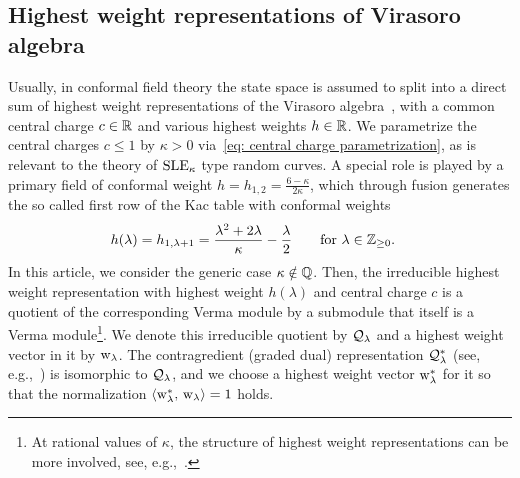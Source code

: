 \documentclass[oneside,english]{amsart}
\numberwithin{equation}{section}
\numberwithin{figure}{section}
\theoremstyle{plain}
\theoremstyle{plain}
\theoremstyle{plain}
\theoremstyle{remark}
\theoremstyle{plain}
\theoremstyle{plain}
\theoremstyle{plain}
\theoremstyle{plain}
\theoremstyle{plain}
\theoremstyle{plain}
\theoremstyle{plain}
\theoremstyle{plain}
\newcommand{\blue}[1]{{\color{blue} #1}}
\newcommand{\red}[1]{{\color{red} #1}}
\begin{document}
\subsection{Highest weight representations of Virasoro algebra}


Usually, in
conformal field theory the state space is assumed to split into a
direct sum of highest weight representations of the Virasoro 
algebra~\cite{Kac-ICM_proceedings_Helsinki, FF-representations, IK-representation_theory_of_the_Virasoro_algebra},
with a common central charge $c\in\mathbb{R}$ and various highest weights
$h\in\mathbb{R}$. We parametrize the central charges $c\leq1$ 
by $\kappa>0$ via~\eqref{eq: central charge parametrization},
as is relevant to the theory of $\mathrm{SLE}_{\kappa}$ type random curves.
A special role is played by a primary field of conformal
weight $h=h_{1, 2} = \frac{6-\kappa}{2\kappa}$, %
which through fusion generates the so called first row of the Kac table with conformal weights 
\begin{align*} %
h(\lambda) = \; & h_{1,\lambda+1}=\frac{\lambda^{2}+2\lambda}{\kappa}-\frac{\lambda}{2} \qquad 
\text{for }
\lambda\in\Znn.
\end{align*}
In this article, we consider the generic case
$\kappa\notin\mathbb{Q}$. %
Then, the irreducible highest weight representation with highest weight $h(\lambda)$ and
central charge $c$ is a quotient of the corresponding Verma module
by a submodule that itself is a Verma module\footnote{At rational values of $\kappa$, the structure of highest weight representations
can be more involved, see, e.g.,~\cite{IK-representation_theory_of_the_Virasoro_algebra}.}. 
We denote this irreducible
quotient %
by $\mathcal{Q}_{\lambda}$ and a highest weight vector in it by $\mathrm{w}_{\lambda}$.
% 
The contragredient (graded dual) representation $\mathcal{Q}_{\lambda}^{*}$
(see, e.g.,~\cite{IK-representation_theory_of_the_Virasoro_algebra}) is isomorphic
to $\mathcal{Q}_{\lambda}$, and we choose a highest weight vector $\mathrm{w}_{\lambda}^{*}$
for it so that the normalization $\left\langle  \mathrm{w}_{\lambda}^{*} , \, \mathrm{w}_{\lambda}  \right\rangle=1$ holds.
\end{document}
